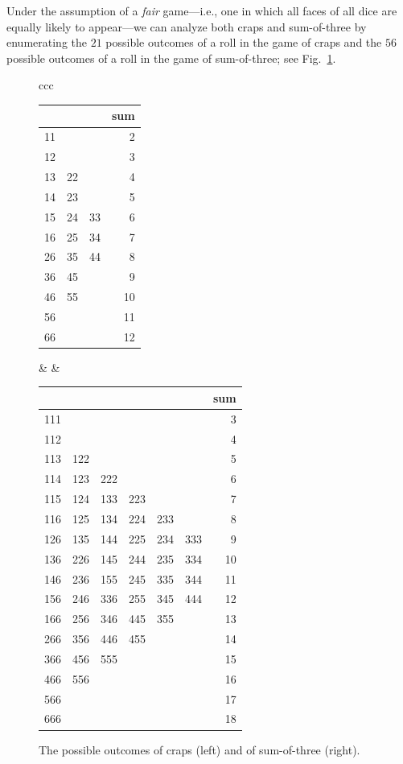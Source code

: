 Under the assumption of a {\em fair} game---i.e., one in which all faces of all dice are equally likely to appear---we can analyze both craps and sum-of-three by enumerating the $21$ possible outcomes of a roll in the game of craps and the $56$ possible outcomes of a roll in the game of sum-of-three; see Fig.~\ref{fig:dice-outcomes}.
\begin{figure}[htb]
\begin{center}
\begin{tabular}{ccc}
\begin{tabular}{|c|c|c|r|}
\hline
   &    &    & sum \\
\hline
11 &    &    & 2 \\
12 &    &    & 3 \\
13 & 22 &    & 4 \\
14 & 23 &    & 5 \\
15 & 24 & 33 & 6 \\
16 & 25 & 34 & 7 \\
26 & 35 & 44 & 8 \\
36 & 45 &    & 9 \\
46 & 55 &    & 10 \\
56 &    &    & 11 \\
66 &    &    & 12 \\
\hline
\end{tabular}
  &
\hspace*{.5in}
  &
\begin{tabular}{|c|c|c|c|c|c|r|}
\hline
 & & & & & & sum\\
\hline
111 & & & & & & 3\\
112 & & & & & & 4\\
113 & 122 & & & & & 5 \\
114 & 123 & 222 & & & & 6 \\
115 & 124 & 133 & 223 & & & 7\\
116 & 125 & 134 &  224 & 233 & & 8\\
126 & 135 & 144 & 225 & 234 & 333 & 9\\
136 & 226 & 145 & 244 & 235 & 334 & 10\\
146 & 236 & 155 & 245 & 335 & 344 & 11\\
156 & 246 & 336 & 255 & 345 & 444 & 12\\
166 & 256 & 346 & 445 & 355 & & 13\\
266 & 356 & 446 & 455 & & & 14\\
366 & 456 & 555 & & & & 15\\
466 & 556 & & & & & 16\\
566 & & & & & & 17\\
666 & & & & & & 18\\
\hline
\end{tabular}
\end{tabular}
\end{center}
\caption{The possible outcomes of craps (left) and of sum-of-three (right).}
\label{fig:dice-outcomes}
\end{figure}


